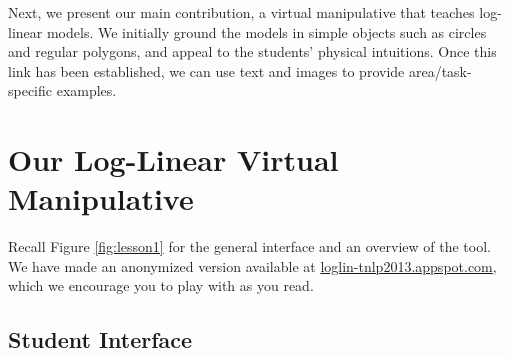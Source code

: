 \documentclass[11pt,letterpaper]{article}
\newcommand{\Note}[1]{}
\renewcommand{\Note}[1]{\hl{[#1]}}
\newcommand{\NoteSigned}[3]{{\sethlcolor{#2}\Note{#1: #3}}}
\newcommand{\NoteJE}[1]{\NoteSigned{JE}{LightGreen}{#1}}
\newcommand{\Commented}[1]{}
\newcommand{\WhereToFind}[0]{\url{loglin-tnlp2013.appspot.com}}
\begin{document}
Next, we present our main contribution, a virtual manipulative that teaches log-linear models. We initially ground 
the models in simple objects such as circles and regular polygons, and appeal to the 
students' physical intuitions. Once this link has been established, we can use text and images to provide area/task-specific 
examples.


\section{Our Log-Linear Virtual Manipulative}\label{sec:overview}

\Commented{
\NoteJE{maybe move this section before ``pedagogical aims'' so that
  the reader can find out sooner about our actual contribution,
  a.k.a. The Cool Stuff?  Then the pedagogical aims would lead right
  into the lessons or could even be combined with them.}}

Recall Figure \ref{fig:lesson1} for the general interface and an overview 
of the tool. We have made an anonymized version available at 
\WhereToFind{}, which we encourage you to play with as you
read.

\Commented{
\NoteJE{The next two sentences seem unnecessary since they'll be
  obvious by the end of the paper if they aren't already.  Again,
  shouldn't we spend as much time as we can on what it's like for the
  student and teacher to use the manipulative, rather than on our
  (mostly) boring and irrelevant experience of designing and coding
  it?  The goal of the paper is to sell other teachers on using the
  app.}  
One of the guiding design goals was to make the educational
tool easy to use by both students and instructors, so that instructors
could tailor the lessons to the needs, interests and abilities of the
students.}

\subsection{Student Interface}
\end{document}
